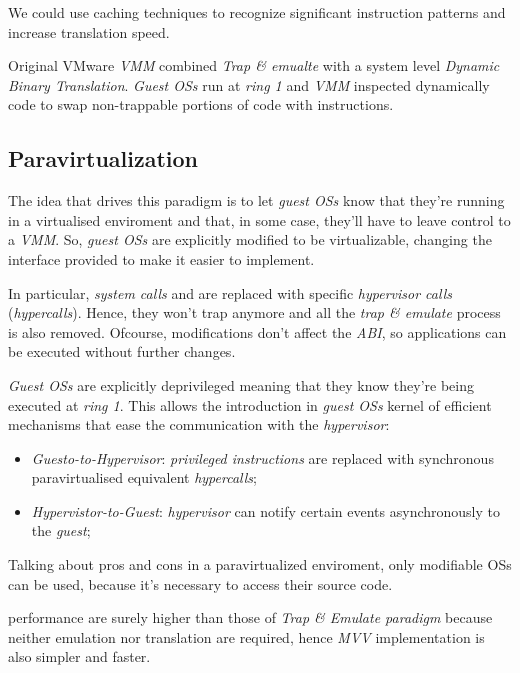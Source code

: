 \begin{note}
    We could use caching techniques to recognize significant instruction patterns
    and increase translation speed.
\end{note}
\begin{note}
    Original VMware \emph{VMM} combined \emph{Trap \& emualte} with a system
    level \emph{Dynamic Binary Translation}. \emph{Guest OSs} run at \emph{ring 1}
    and \emph{VMM} inspected dynamically code to swap non-trappable portions of
    code with  instructions.
\end{note}

\subsection{Paravirtualization}
The idea that drives this paradigm is to let \emph{guest OSs} know that
they're running in a virtualised enviroment and that, in some case, they'll
have to leave control to a \emph{VMM}. So, \emph{guest OSs} are explicitly
modified to be virtualizable, changing the interface provided to make it
easier to implement.

In particular, \emph{system calls} and  are
replaced with specific \emph{hypervisor calls} (\emph{hypercalls}). Hence,
they won't trap anymore and all the \emph{trap \& emulate} process is also
removed. Ofcourse, modifications don't affect the \emph{ABI}, so applications
can be executed without further changes.

\emph{Guest OSs} are explicitly deprivileged meaning that they know they're being
executed at \emph{ring 1}. This allows the introduction in \emph{guest OSs}
kernel of efficient mechanisms that ease the communication with the
\emph{hypervisor}:
\begin{itemize}
    \item\emph{Guesto-to-Hypervisor}: \emph{privileged instructions} are replaced
    with synchronous paravirtualised equivalent \emph{hypercalls};
    \item\emph{Hypervistor-to-Guest}: \emph{hypervisor} can notify certain events
    asynchronously to the \emph{guest};
\end{itemize}

\bigskip\noindent
Talking about pros and cons in a paravirtualized enviroment, only modifiable
OSs can be used, because it's necessary to access their source code.

performance are surely higher than those of \emph{Trap \& Emulate paradigm}
because neither emulation nor translation are required, hence \emph{MVV}
implementation is also simpler and faster.

